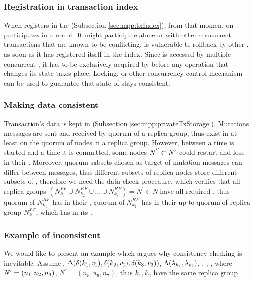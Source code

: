 \subsubsection{Registration in transaction index}
When \transaction registers in the \txIndex (Subsection \ref{sec:mpp:txIndex}), from that moment on \transaction participates in a \paxos round.
It might participate alone or with other concurrent transactions that are known to be conflicting. 
\transaction is vulnerable to rollback by other \transactionj, as soon as it has registered itself in the index.
Since \txIndex is accessed by multiple concurrent \transactions, it has to be exclusively acquired by \transaction before any operation that changes its state takes place. 
Locking, or other concurrency control mechanism can be used to guarantee that state of \txIndex stays consistent.


        
\subsubsection{Making data consistent}
Transaction’s data is kept in \txStorage (Subsection \ref{sec:mpp:privateTxStorage}). 
Mutations messages are sent and received by quorum of a replica group, thus \mutations exist in \txStorage at least on the quorum of nodes in a replica group. However, between a time \transaction is started and a time it is committed, some nodes $N^{''} \subset \text{$\mathit{N'}$}$ could restart and lose \mutations in their \txStorage. Moreover, quorum subsets chosen as target of mutation messages can differ between messages, thus different subsets of replica nodes store different subsets of \mutations, therefore we need the data check procedure, which verifies that all replica groups  $(N^{RF}_{k_1} \cup N^{RF}_{k_2} \cup ... \cup N^{RF}_{k_i} ) = \mathit{N^'} \in \mathit{N}$ have all required \mutationsFullEnd, thus quorum of $N^{RF}_{k_1}$ has  in their \txStorage, quorum of $N^{RF}_{k_2}$ has  in their \txStorage up to quorum of replica group $N^{RF}_{k_i}$, which has  in its \txStorage.

\subsubsection{Example of inconsistent \txStorage}
We would like to present an example which argues why consistency checking is inevitable.
Assume , 
$\text{$\Delta$}(\text{$\delta(k_1, v_1)$}, \text{$\delta(k_2, v_2)$}, \text{$\delta(k_3, v_3)$})$,
$\text{$\Lambda$}(\text{$\lambda_{k_1}$}, \text{$\lambda_{k_2}$})$,
, 
, 
, 
where $\text{$\mathit{N'}$}=(n_1, n_2, n_3)$, 
$\mathit{N^{''}}=(n_5,n_6,n_7)$,
thus $k_1, k_2$ have the same replica group \nodesTx.

